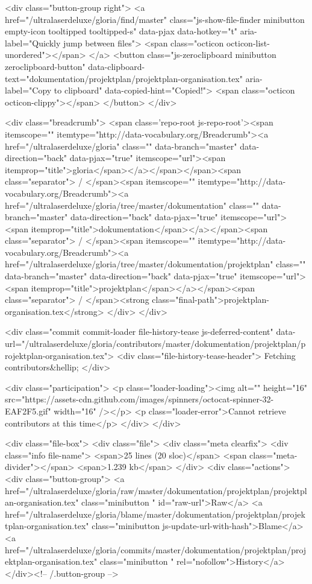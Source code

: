   <div class="button-group right">
    <a href="/ultralaserdeluxe/gloria/find/master"
          class="js-show-file-finder minibutton empty-icon tooltipped tooltipped-s"
          data-pjax
          data-hotkey="t"
          aria-label="Quickly jump between files">
      <span class="octicon octicon-list-unordered"></span>
    </a>
    <button class="js-zeroclipboard minibutton zeroclipboard-button"
          data-clipboard-text="dokumentation/projektplan/projektplan-organisation.tex"
          aria-label="Copy to clipboard"
          data-copied-hint="Copied!">
      <span class="octicon octicon-clippy"></span>
    </button>
  </div>

  <div class="breadcrumb">
    <span class='repo-root js-repo-root'><span itemscope="" itemtype="http://data-vocabulary.org/Breadcrumb"><a href="/ultralaserdeluxe/gloria" class="" data-branch="master" data-direction="back" data-pjax="true" itemscope="url"><span itemprop="title">gloria</span></a></span></span><span class="separator"> / </span><span itemscope="" itemtype="http://data-vocabulary.org/Breadcrumb"><a href="/ultralaserdeluxe/gloria/tree/master/dokumentation" class="" data-branch="master" data-direction="back" data-pjax="true" itemscope="url"><span itemprop="title">dokumentation</span></a></span><span class="separator"> / </span><span itemscope="" itemtype="http://data-vocabulary.org/Breadcrumb"><a href="/ultralaserdeluxe/gloria/tree/master/dokumentation/projektplan" class="" data-branch="master" data-direction="back" data-pjax="true" itemscope="url"><span itemprop="title">projektplan</span></a></span><span class="separator"> / </span><strong class="final-path">projektplan-organisation.tex</strong>
  </div>
</div>


  <div class="commit commit-loader file-history-tease js-deferred-content" data-url="/ultralaserdeluxe/gloria/contributors/master/dokumentation/projektplan/projektplan-organisation.tex">
    <div class="file-history-tease-header">
      Fetching contributors&hellip;
    </div>

    <div class="participation">
      <p class="loader-loading"><img alt="" height="16" src="https://assets-cdn.github.com/images/spinners/octocat-spinner-32-EAF2F5.gif" width="16" /></p>
      <p class="loader-error">Cannot retrieve contributors at this time</p>
    </div>
  </div>

<div class="file-box">
  <div class="file">
    <div class="meta clearfix">
      <div class="info file-name">
          <span>25 lines (20 sloc)</span>
          <span class="meta-divider"></span>
        <span>1.239 kb</span>
      </div>
      <div class="actions">
        <div class="button-group">
          <a href="/ultralaserdeluxe/gloria/raw/master/dokumentation/projektplan/projektplan-organisation.tex" class="minibutton " id="raw-url">Raw</a>
            <a href="/ultralaserdeluxe/gloria/blame/master/dokumentation/projektplan/projektplan-organisation.tex" class="minibutton js-update-url-with-hash">Blame</a>
          <a href="/ultralaserdeluxe/gloria/commits/master/dokumentation/projektplan/projektplan-organisation.tex" class="minibutton " rel="nofollow">History</a>
        </div><!-- /.button-group -->


